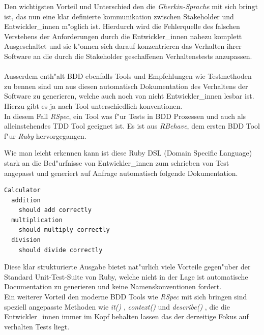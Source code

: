 \documentclass[runningheads,a4paper]{llncs}
\begin{document}
      Den wichtigsten Vorteil und Unterschied den die {\em Gherkin-Sprache} 
      mit sich bringt ist, das nun eine klar definierte kommunikation zwischen 
      Stakeholder und Entwickler\_innen m"oglich ist. Hierdurch wird die 
      Fehlerquelle des falschen Verstehens der Anforderungen durch die 
      Entwickler\_innen nahezu komplett Ausgeschaltet und sie k"onnen sich darauf
      konzentrieren das Verhalten ihrer Software an die durch die Stakeholder
      geschaffenen Verhaltenstests anzupassen.\\\\

      Ausserdem enth"alt BDD ebenfalls Tools und Empfehlungen wie Testmethoden
      zu bennen sind um aus diesen automatisch Dokumentation des Verhaltens 
      der Software zu generieren, welche auch noch von nicht Entwickler\_innen
      lesbar ist. Hierzu gibt es ja nach Tool unterschiedlich konventionen.\\
      In diesem Fall {\em RSpec}\cite{Rspec}, ein Tool was f"ur Tests in BDD 
      Prozessen und auch als alleinstehendes TDD Tool geeignet ist. Es ist aus 
      {\em RBehave}\cite{North:2007}, dem ersten BDD Tool f"ur {\em Ruby} hervorgegangen.
      
      Wie man leicht erkennen kann ist diese Ruby DSL (Domain Specific Language)
      stark an die Bed"urfnisse von Entwickler\_innen zum schrieben von Test
      angepasst und generiert auf Anfrage automatisch folgende Dokumentation.
      \begin{lstlisting}[caption=RSpec Documentation Ausgabe]
Calculator
  addition
    should add correctly
  multiplication
    should multiply correctly
  division
    should divide correctly
      \end{lstlisting}
      Diese klar strukturierte Ausgabe bietet nat"urlich viele Vorteile gegen"uber
      der Standard Unit-Test-Suite von Ruby, welche nicht in der Lage ist 
      automatische Documentation zu generieren und keine Namenskonventionen 
      fordert.\\
      Ein weiterer Vorteil den moderne BDD Tools wie {\em RSpec } mit sich bringen
      sind speziell angepasste Methoden wie {\em it() }, {\em context()} und 
      {\em describe() }, die die Entwickler\_innen immer im Kopf behalten lassen
      das der derzeitige Fokus auf verhalten Tests liegt.
\end{document}
